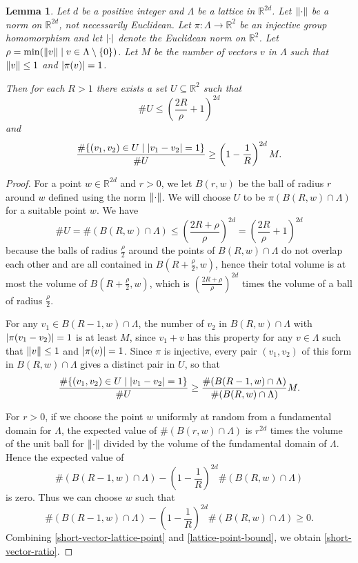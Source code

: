 \documentclass[12pt]{amsart}
\newtheorem{lemma}[theo]{Lemma}
\theoremstyle{remark}
\theoremstyle{definition}
\begin{document}
\begin{lemma}\label{set-from-lattice} Let $d$ be a positive integer and $\Lambda$ be a lattice in $\mathbb R^{2d}$. Let $\norm{\cdot}$ be a norm on $\mathbb R^{2d}$, not necessarily Euclidean.  Let $\pi \colon \Lambda \to \mathbb R^{2}$ be an injective group homomorphism and let $\abs{\cdot}$ denote the Euclidean norm on $\mathbb R^2$. Let $\rho = \min ( \norm{v} \mid v \in \Lambda \setminus\{0\})$. Let $M$ be the number of vectors $v$ in $\Lambda$ such that $\norm{v} \leq 1$ and $ \abs{ \pi(v)}=1$. 

Then for each $R>1$ there exists a set $U \subseteq \mathbb R^2$ such that \[\# U \leq  \left( \frac{ 2R}{\rho}+1 \right)^{2d}\] and \begin{equation}\label{short-vector-ratio} \frac{\# \{ (v_1,v_2) \in U \mid \abs{v_1-v_2}=1\} }{ \# U} \geq \left(1-\frac{1}{R}\right)^{2d} M .\end{equation}
\end{lemma}

\begin{proof} For a point $w \in \mathbb R^{2d}$ and $r>0$, we let $B(r,w)$ be the ball of radius $r$ around $w$ defined using the norm $\norm{\cdot}$. We will choose $U$ to be $\pi ( B(R,w) \cap \Lambda)$ for a suitable point $w$.  We have
\[ \#U = \# (B(R,w)\cap \Lambda) \leq \left( \frac{ 2R+\rho}{\rho} \right)^{2d}= \left( \frac{ 2R}{\rho}+1 \right)^{2d} \]
because the balls of radius $\frac{\rho}{2}$ around the points of $B(R,w)\cap \Lambda$ do not overlap each other and are all contained in $B(R+\frac{\rho}{2},w)$, hence their total volume is at most the volume of $B(R+\frac{\rho}{2},w)$, which is $ \left( \frac{ 2R+\rho}{\rho} \right)^{2d}$ times the volume of a ball of radius $\frac{\rho}{2}$.

For any $ v_1 \in B(R-1,w)\cap \Lambda$, the number of $v_2$ in $B(R,w)\cap \Lambda$ with $\abs{\pi(v_1-v_2)}=1$ is at least $M$, since $v_1+v$ has this property for any $v\in \Lambda $ such that $\norm{v} \leq 1$ and $ \abs{ \pi(v)}=1$. Since $\pi$ is injective, every pair $(v_1,v_2)$ of this form in $B(R,w) \cap \Lambda$ gives a distinct pair in $U$, so that
\begin{equation}\label{short-vector-lattice-point}\frac{ \# \{ (v_1,v_2) \in U \mid \abs{v_1-v_2}=1\} }{\#U} \geq \frac{ \# (B(R-1,w)\cap \Lambda)}{\#(B(R,w)\cap \Lambda)} M .\end{equation}

For $r>0$, if we choose the point $w$ uniformly at random from a fundamental domain for $\Lambda$, the expected value of $\#(B(r,w) \cap \Lambda)$ is  $r^{2d}$ times the volume of the unit ball for $\norm{\cdot}$ divided by the volume of the fundamental domain of $\Lambda$. Hence the expected value of 
\[ \#(B(R-1,w) \cap \Lambda) - \left( 1-\frac{1}{R} \right)^{2d} \#(B(R,w)\cap \Lambda) \] is zero. Thus we can choose $w$ such that \begin{equation}\label{lattice-point-bound} \#(B(R-1,w) \cap \Lambda) - \left( 1-\frac{1}{R} \right)^{2d} \#(B(R,w)\cap \Lambda) \geq 0.\end{equation} Combining \eqref{short-vector-lattice-point} and \eqref{lattice-point-bound}, we obtain \eqref{short-vector-ratio}.
\end{proof}
\end{document}
